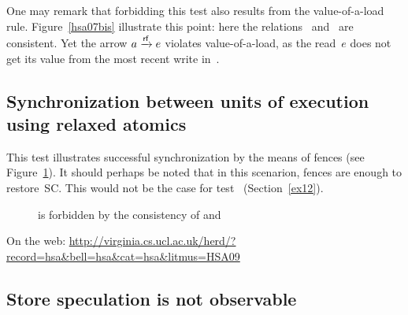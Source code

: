\documentclass[a4paper]{article}
\begin{document}
One may remark that forbidding this test also results
from the value-of-a-load rule. Figure~\ref{hsa07bis} illustrate this point:
here the relations~\hhb{} and~\coh{} are consistent.
Yet the arrow $a \xrightarrow{\textsf{\scriptsize{}rf}} e$ violates value-of-a-load,
as the read~$e$ does not get its value from the most recent write in~\coh{}.

\pagebreak


\subsection{Synchronization between units of execution using relaxed atomics}


This test illustrates successful synchronization by the means of fences (see
Figure~\ref{hsa09}).  It should perhaps be noted that in this scenarion, fences
are enough to restore~SC.  This would not be the case for test~
(Section~\ref{ex12}).

\begin{figure}[htp]
\begin{center}\moveback{}
\end{center}
\caption{\label{hsa09}  is forbidden by the consistency
of \hhb{} and \coh{} \color{red}{(Forbidden)}}
\end{figure}

On the web:
\url{http://virginia.cs.ucl.ac.uk/herd/?record=hsa&bell=hsa&cat=hsa&litmus=HSA09}

\pagebreak

\subsection{Store speculation is not observable}

\end{document}
